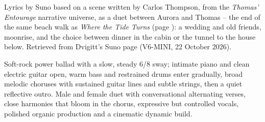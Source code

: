 
\label{sec:stay-a-little-longer}
\begin{notes}
Lyrics by Suno based on a scene written by Carlos Thompson, from the \emph{Thomas' Entourage} narrative universe, as a duet between Aurora and Thomas -- the end of the same beach walk as \emph{Where the Tide Turns} (page \pageref{sec:where-the-tide-turns}): a wedding and old friends, moonrise, and the choice between dinner in the cabin or the tunnel to the house below. Retrieved from Dvigitt's Suno page (V6-MINI, 22 October 2026).
\end{notes}
\begin{style}
Soft-rock power ballad with a slow, steady 6/8 sway; intimate piano and clean electric guitar open, warm bass and restrained drums enter gradually, broad melodic choruses with sustained guitar lines and subtle strings, then a quiet reflective outro. Male and female duet with conversational alternating verses, close harmonies that bloom in the chorus, expressive but controlled vocals, polished organic production and a cinematic dynamic build.
\end{style}
